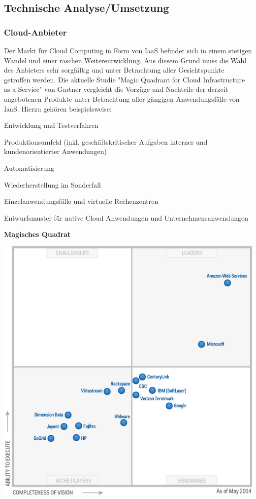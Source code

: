 \documentclass[12pt,a4paper,bibliography=totocnumbered,listof=totocnumbered]{scrartcl}
\begin{document}
\subsection{Technische Analyse/Umsetzung}

\subsubsection{Cloud-Anbieter}
Der Markt für Cloud Computing in Form von IaaS befindet sich in einem stetigen Wandel und einer raschen Weiterentwicklung. Aus diesem Grund muss die Wahl des Anbieters sehr sorgfältig und unter Betrachtung aller Gesichtspunkte getroffen werden. Die aktuelle Studie "Magic Quadrant for Cloud Infrastructure as a Service" von Gartner \cite{30} vergleicht die Vorzüge und Nachteile der derzeit angebotenen Produkte unter Betrachtung aller gängigen Anwendungsfälle von IaaS. Hierzu gehören beispielsweise:
\begin{compactitem}
	\item Entwicklung und Testverfahren
	\item Produktionsumfeld (inkl. geschäftskritischer Aufgaben interner und kundenorientierter Anwendungen)
	\item Automatisierung
	\item Wiederherstellung im Sonderfall
	\item Einzelanwendungsfälle und virtuelle Rechenzentren
	\item Entwurfsmuster für native Cloud Anwendungen und Unternehmensanwendungen
\end{compactitem}

\textbf{Magisches Quadrat}
\vspace{1em}
$\;$\\
\begin{minipage}{\linewidth}
	\centering
	\includegraphics[width=0.7\linewidth]{Gartner_Magic_Square.png}
\end{minipage}
\vspace{1em}
\end{document}
